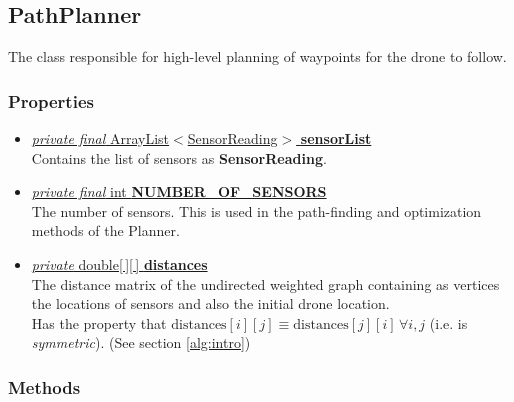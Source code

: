 \documentclass{article}
\newcommand{\prop}[3]{\underline{\textit{#1} #2 \textbf{#3}}}
\begin{document}
\subsection{PathPlanner}
\label{cls:PathPlanner}

The class responsible for high-level planning of waypoints for the drone to follow.

\subsubsection*{Properties}

\begin{itemize}
\item \prop{private final}{ArrayList$<$SensorReading$>$}{sensorList} \\
  Contains the list of sensors as \textbf{SensorReading}.
\item \prop{private final}{int}{NUMBER\_OF\_SENSORS} \\
  The number of sensors. This is used in the path-finding and optimization methods of the Planner.
\item \prop{private}{double[\,][\,]}{distances} \\
  The distance matrix of the undirected weighted graph containing as vertices the locations of sensors and also the initial drone location.\\
  Has the property that $\mathrm{distances}[i][j] \equiv \mathrm{distances}[j][i]\,\forall i,j$ (i.e. is \textit{symmetric}). (See section \ref{alg:intro})
\end{itemize}

\subsubsection*{Methods}
\end{document}
